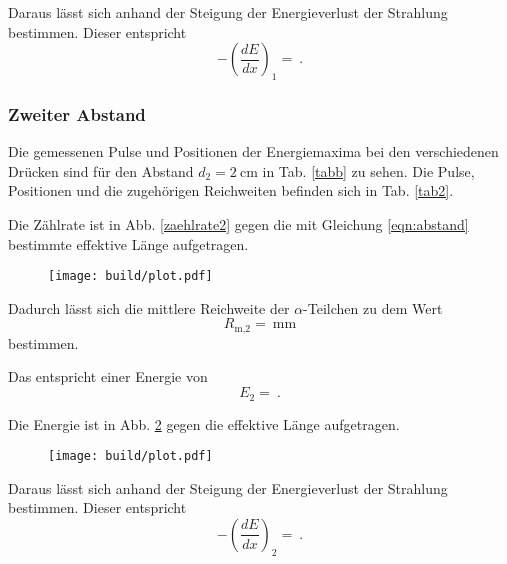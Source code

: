 \noindent Daraus lässt sich anhand der Steigung der Energieverlust der Strahlung bestimmen. Dieser entspricht %
\begin{equation*}
    - \left( \frac{dE}{dx} \right)_1 = \SI{}{}.
\end{equation*}


\subsubsection{Zweiter Abstand}
Die gemessenen Pulse und Positionen der Energiemaxima bei den verschiedenen Drücken sind für den Abstand $d_2 = \SI{2}{\centi\meter}$ in Tab. \ref{tabb} zu sehen. Die Pulse, Positionen und die zugehörigen Reichweiten befinden sich in Tab. \ref{tab2}.




\noindent Die Zählrate ist in Abb. \ref{zaehlrate2} gegen die mit Gleichung \eqref{eqn:abstand} bestimmte effektive Länge aufgetragen.
\begin{figure}
    \centering
    \texttt{[image: build/plot.pdf]}
    \caption{}
    \label{fig:zaehlrate2}
\end{figure}

\noindent Dadurch lässt sich die mittlere Reichweite der $\alpha$-Teilchen zu dem Wert %
\begin{equation*}
    R_\text{m,2} = \SI{}{\milli\meter}
\end{equation*}
bestimmen.

\noindent Das entspricht einer Energie von %
\begin{equation*}
    E_2 = \SI{}{}.
\end{equation*}

Die Energie ist in Abb. \ref{fig:energie2} gegen die effektive Länge aufgetragen.
\begin{figure}
    \centering
    \texttt{[image: build/plot.pdf]}
    \caption{}
    \label{fig:energie2}
\end{figure}

\noindent Daraus lässt sich anhand der Steigung der Energieverlust der Strahlung bestimmen. Dieser entspricht %
\begin{equation*}
    - \left( \frac{dE}{dx} \right)_2 = \SI{}{}.
\end{equation*}


